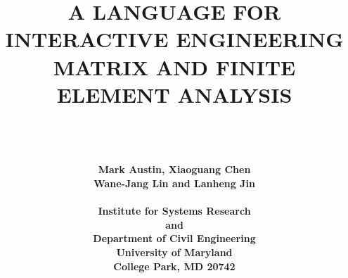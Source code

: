 



\renewcommand{\baselinestretch}{1.5}
\textheight 9.0in
\textwidth 6.40in
\voffset -0.85in
\hoffset -0.60in
\def\R{{\bf R}}
\def\j{{\rm j}}
\def\C{{\bf C}}


\title{\bf A LANGUAGE FOR INTERACTIVE ENGINEERING MATRIX AND FINITE ELEMENT ANALYSIS}

\author{                               \\
                                       \\
                                       \\
        \bf Mark Austin, Xiaoguang Chen \\
        \bf Wane-Jang Lin and Lanheng Jin\\
                                         \\
            Institute for Systems Research\\
            and \\
            Department of Civil Engineering\\
            University of Maryland \\
            College Park, MD 20742}


\maketitle

